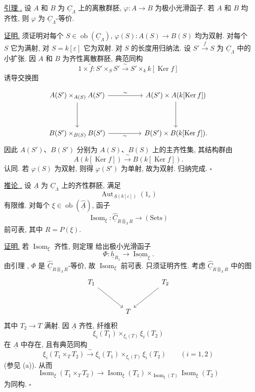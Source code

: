 
\underline{引理 .}
设 $A$ 和 $B$ 为 $\underline C_\Lambda$ 上的离散群胚,
$\varphi:A\longrightarrow B$ 为极小光滑函子.
若 $A$ 和 $B$ 均齐性, 则 $\varphi$ 为 $\underline C_\Lambda$-等价.

\underline{证明.} 须证明对每个 $S\in\operatorname{ob}(\underline C_\Lambda)$,
$\varphi(S):A(S)\longrightarrow B(S)$ 均为双射.
对每个 $S$ 它为满射, 对 $S=k[\varepsilon]$ 它为双射.
对 $S$ 的长度用归纳法. 设 $S'\xrightarrow fS$ 为 $\underline C_\Lambda$ 中的小扩张.
因 $A$ 和 $B$ 为齐性离散群胚, 典范同构
\[
 1\times\widetilde f:S'\times_SS'
 \xrightarrow{\ \sim\ }S'\times_k k[\operatorname{Ker}f]
\]
诱导交换图


\[
\begin{tikzcd}[column sep=huge,row sep=huge]
 A(S')\times_{A(S)}A(S') \arrow[r,"\sim"] \arrow[d]
 & A(S')\times A(k[\operatorname{Ker}f]) \arrow[d]\\
 B(S')\times_{B(S)}B(S') \arrow[r,"\sim"']
 & B(S')\times B(k[\operatorname{Ker}f]).
\end{tikzcd}
\]
因此 $A(S')$、$B(S')$ 分别为 $A(S)$、$B(S)$ 上的主齐性集,
其结构群由
\[
 A(k[\operatorname{Ker}f])\xrightarrow{\ \sim\ }
 B(k[\operatorname{Ker}f]).
\]
认同. 若 $\varphi(S)$ 为双射, 则得 $\varphi(S')$ 为单射, 故为双射.
归纳完成. \hfill$\square$

\underline{推论 .}
设 $\underline A$ 为 $\underline C_\Lambda$ 上的齐性群胚, 满足
\[
 \operatorname{Aut}_{\underline A(k[\varepsilon])}(1_\varepsilon)
\]
有限维. 对每个 $\xi\in\operatorname{ob}(\widehat{\underline A})$, 函子
\[
 \operatorname{Isom}_\xi:
 \widehat{\underline C}_{R\widehat\otimes_\Lambda R}
 \longrightarrow(\mathrm{Sets})
\]
前可表, 其中 $R=P(\xi)$.

\underline{证明.} 若 $\operatorname{Isom}_\xi$ 齐性,
则定理  给出极小光滑函子
\[
 \Phi:\underline h_{R_1}\longrightarrow
 \underline{\operatorname{Isom}}_\xi.
\]
由引理 , $\Phi$ 是
$\widehat{\underline C}_{R\widehat\otimes_\Lambda R}$-等价,
故 $\operatorname{Isom}_\xi$ 前可表. 只须证明齐性.
考虑 $\widehat{\underline C}_{R\widehat\otimes_\Lambda R}$ 中的图
\[
\begin{tikzcd}[column sep=large,row sep=large]
 T_1 \arrow[dr] && T_2 \arrow[dl]\\
 & T &
\end{tikzcd}
\]
其中 $T_2\longrightarrow T$ 满射.
因 $\underline A$ 齐性, 纤维积
\[
 \xi_i(T_1)\times_{\xi_i(T)}\xi_i(T_2)
\]
在 $\underline A$ 中存在, 且有典范同构
\[
 \xi_i(T_1\times_TT_2)\xrightarrow{\ \sim\ }
 \xi_i(T_1)\times_{\xi_i(T)}\xi_i(T_2)
 \qquad(i=1,2)
\]
(参见 (a)). 从而
\[
 \operatorname{Isom}_\xi(T_1\times_TT_2)
 \longrightarrow
 \operatorname{Isom}_\xi(T_1)
 \times_{\operatorname{Isom}_\xi(T)}
 \operatorname{Isom}_\xi(T_2)
\]
为同构. \hfill$\square$

